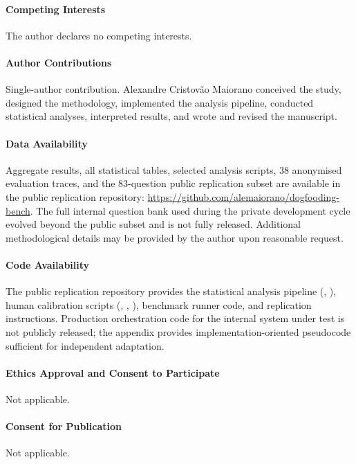 \documentclass[twocolumn]{article}
\begin{document}
\paragraph{Competing Interests}
The author declares no competing interests.

\paragraph{Author Contributions}
Single-author contribution. Alexandre Cristov\~ao Maiorano conceived the study, designed the methodology, implemented the analysis pipeline, conducted statistical analyses, interpreted results, and wrote and revised the manuscript.

\paragraph{Data Availability}
Aggregate results, all statistical tables, selected analysis scripts, 38
anonymised evaluation traces, and the 83-question public replication subset are
available in the public replication repository:
\url{https://github.com/alemaiorano/dogfooding-bench}. The full internal
question bank used during the private development cycle evolved beyond the
public subset and is not fully released. Additional methodological details may
be provided by the author upon reasonable request.

\paragraph{Code Availability}
The public replication repository provides the statistical analysis pipeline
(, ), human calibration
scripts (, ,
), benchmark runner code, and replication
instructions. Production orchestration code for the internal system under test
is not publicly released; the appendix provides implementation-oriented
pseudocode sufficient for independent adaptation.

\paragraph{Ethics Approval and Consent to Participate}
Not applicable.

\paragraph{Consent for Publication}
Not applicable.



\end{document}
